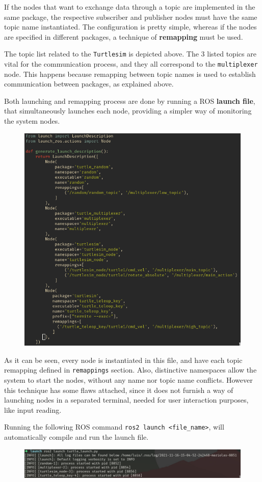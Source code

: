 If the nodes that want to exchange data through a topic are implemented in the same package, the respective subscriber and publisher nodes must have the same topic name instantiated. The configuration is pretty simple, whereas if the nodes are specified in different packages, a technique of \textbf{remapping} must be used.

The topic list related to the \texttt{Turtlesim} is depicted above. The 3 listed topics are vital for the communication process, and they all correspond to the \texttt{multiplexer} node. This happens because remapping between topic names is used to establish communication between packages, as explained above.

Both launching and remapping process are done by running a ROS \textbf{launch file}, that simultaneously launches each node, providing a simpler way of monitoring the system nodes. 

\begin{figure}[H]
        \centering
         \includegraphics[width=0.3\linewidth]{images/ts_launch_file.png}
\end{figure}

As it can be seen, every node is instantiated in this file, and have each topic remapping defined in \texttt{remappings} section. Also, distinctive namespaces allow the system to start the nodes, without any name nor topic name conflicts. However this technique has some flaws attached, since it does not furnish a way of launching nodes in a separated terminal, needed for user interaction purposes, like input reading.

Running the following ROS command \texttt{ros2 launch <file\_name>}, will automatically compile and run the launch file.

\begin{figure}[H]
        \centering
         \includegraphics[width=0.7\linewidth]{images/ts_launch_ros.png}
\end{figure}

